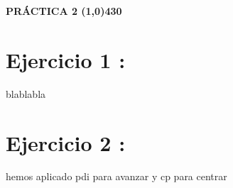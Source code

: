 \documentclass{article}
\begin{document}
\begin{center}
 \LARGE\bfseries PRÁCTICA 2 
 \line(1,0){430}
\end{center}

\section*{Ejercicio 1 :}
blablabla
\section*{Ejercicio 2 :}
hemos aplicado pdi para avanzar y cp para centrar
\end{document}
